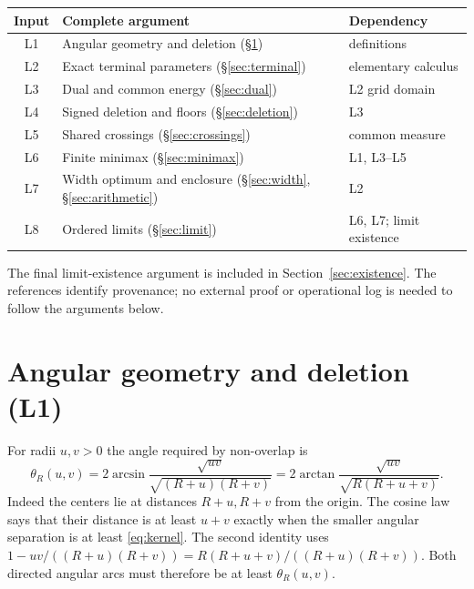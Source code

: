 \documentclass[review,supplement,hidelinks,onefignum,onetabnum]{siamart251216}
\begin{document}
\begin{center}\small
\begin{tabular}{@{}cll@{}}\toprule
Input & Complete argument & Dependency\\\midrule
L1 & Angular geometry and deletion (\S\ref{sec:geometry}) & definitions\\
L2 & Exact terminal parameters (\S\ref{sec:terminal}) & elementary calculus\\
L3 & Dual and common energy (\S\ref{sec:dual}) & L2 grid domain\\
L4 & Signed deletion and floors (\S\ref{sec:deletion}) & L3\\
L5 & Shared crossings (\S\ref{sec:crossings}) & common measure\\
L6 & Finite minimax (\S\ref{sec:minimax}) & L1, L3--L5\\
L7 & Width optimum and enclosure (\S\ref{sec:width}, \S\ref{sec:arithmetic}) & L2\\
L8 & Ordered limits (\S\ref{sec:limit}) & L6, L7; limit existence\\\bottomrule
\end{tabular}
\end{center}
The final limit-existence argument is included in Section~\ref{sec:existence}.
The references identify provenance; no external proof or operational log is
needed to follow the arguments below.

\section{Angular geometry and deletion (L1)}\label{sec:geometry}
For radii $u,v>0$ the angle required by non-overlap is
\begin{equation}\label{eq:kernel}
\theta_R(u,v)=2\arcsin\frac{\sqrt{uv}}{\sqrt{(R+u)(R+v)}}
=2\arctan\frac{\sqrt{uv}}{\sqrt{R(R+u+v)}}.
\end{equation}
Indeed the centers lie at distances $R+u,R+v$ from the origin. The cosine
law says that their distance is at least $u+v$ exactly when the smaller
angular separation is at least \eqref{eq:kernel}. The second identity
uses $1-uv/((R+u)(R+v))=R(R+u+v)/((R+u)(R+v))$.
Both directed angular arcs must therefore be at least $\theta_R(u,v)$.
\end{document}
